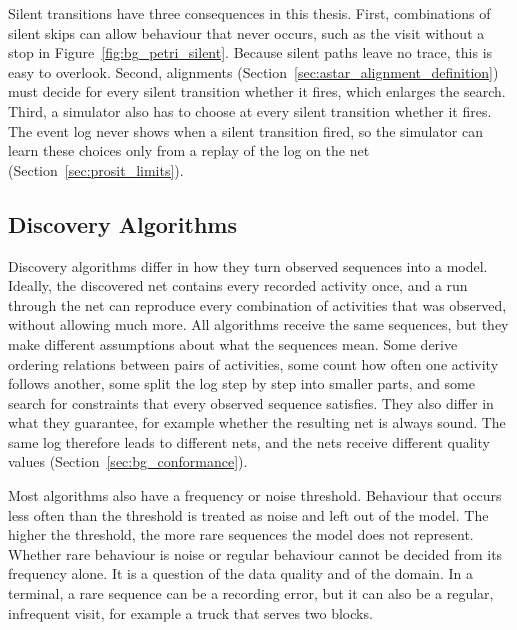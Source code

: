 Silent transitions have three consequences in this thesis. First,
combinations of silent skips can allow behaviour that never occurs, such as the
visit without a stop in Figure~\ref{fig:bg_petri_silent}. Because silent paths
leave no trace, this is easy to overlook. Second, alignments
(Section~\ref{sec:astar_alignment_definition}) must decide for every silent
transition whether it fires, which enlarges the search. Third, a simulator also
has to choose at every silent transition whether it fires. The event log never
shows when a silent transition fired, so the simulator can learn these choices
only from a replay of the log on the net (Section~\ref{sec:prosit_limits}).


\subsection{Discovery Algorithms}
\label{sec:bg_algorithms}

Discovery algorithms differ in how they turn observed sequences into a model.
Ideally, the discovered net contains every recorded activity once, and a run
through the net can reproduce every combination of activities that was
observed, without allowing much more. All algorithms receive the same
sequences, but they make different assumptions about what the sequences mean.
Some derive ordering relations between pairs of activities, some count how
often one activity follows another, some split the log step by step into
smaller parts, and some search for constraints that every observed sequence
satisfies. They also differ in what they guarantee, for example whether the
resulting net is always sound. The same log therefore leads to different nets,
and the nets receive different quality values
(Section~\ref{sec:bg_conformance}).

Most algorithms also have a frequency or noise threshold. Behaviour that occurs
less often than the threshold is treated as noise and left out of the model.
The higher the threshold, the more rare sequences the model does not represent.
Whether rare behaviour is noise or regular behaviour cannot be decided from its
frequency alone. It is a question of the data quality and of the domain. In a
terminal, a rare sequence can be a recording error, but it can also be a
regular, infrequent visit, for example a truck that serves two blocks.

